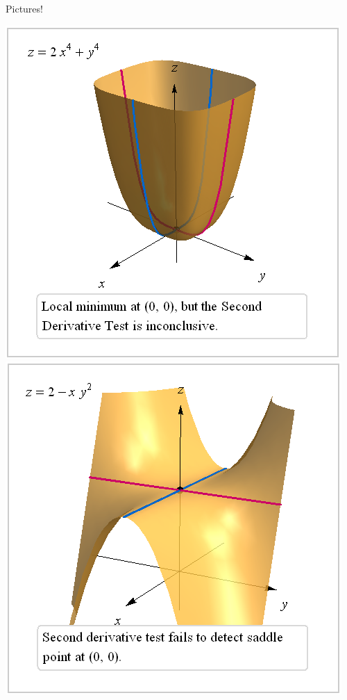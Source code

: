 \documentclass[12pt]{beamer}
\theoremstyle{plain}
\theoremstyle{definition}
\begin{document}
% 
\begin{frame}[allowframebreaks]{\small Pictures!}
\begin{center}
\includegraphics[scale=0.4]{12-8inconclusive}
\includegraphics[scale=0.4]{12-8saddle}
\end{center}


\end{frame}
\end{document}

